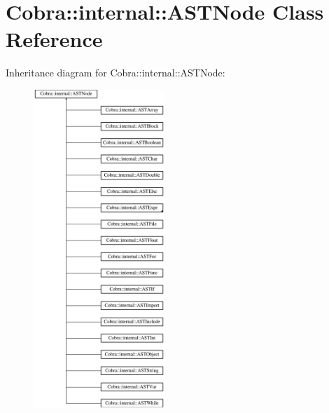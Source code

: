 \hypertarget{class_cobra_1_1internal_1_1_a_s_t_node}{\section{Cobra\+:\+:internal\+:\+:A\+S\+T\+Node Class Reference}
\label{class_cobra_1_1internal_1_1_a_s_t_node}
}
Inheritance diagram for Cobra\+:\+:internal\+:\+:A\+S\+T\+Node\+:\begin{figure}[H]
\begin{center}
\leavevmode
\includegraphics[height=12.000000cm]{class_cobra_1_1internal_1_1_a_s_t_node}
\end{center}
\end{figure}
